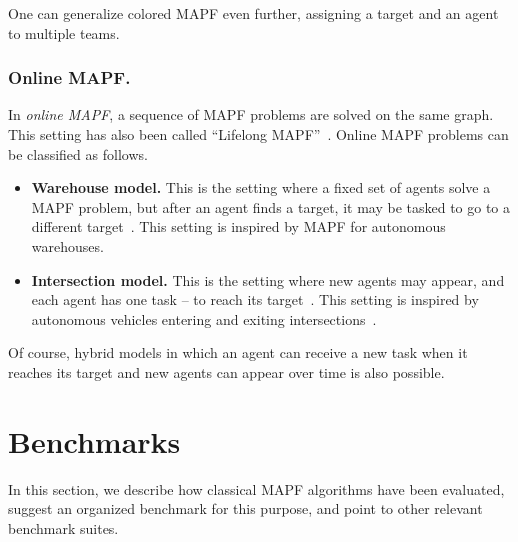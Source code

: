 \documentclass[letterpaper]{article} %
\newcommand{\mapf}{\ac{MAPF}\xspace}
\begin{document}
One can generalize colored \mapf even further, assigning a target and an agent to multiple teams. 


\subsubsection{Online MAPF.}
In \emph{online \mapf}, a sequence of \mapf problems are solved on the same graph. This setting has also been called ``Lifelong MAPF''~\cite{MaAAMAS17,MaAAAI19b}. Online \mapf problems can be classified as follows.
\begin{itemize}
    \item \textbf{Warehouse model.} This is the setting where a fixed set of agents solve a \mapf problem, but after an agent finds a target, it may be tasked to go to a different target~\cite{MaAAAI19b}. This setting is inspired by \mapf for autonomous warehouses.
    \item \textbf{Intersection model.} This is the setting where new agents may appear, and each agent has one task -- to reach its target~\cite{svancara2019online}. This setting is inspired by autonomous vehicles entering and exiting intersections~\cite{dresner2008multiagent}. 
\end{itemize}
Of course, hybrid models in which an agent can receive a new task when it reaches its target and new agents can appear over time is also possible. 

\section{Benchmarks}

In this section, we describe how classical \mapf algorithms have been evaluated, suggest an organized benchmark for this purpose, and point to other relevant benchmark suites. 

\end{document}
